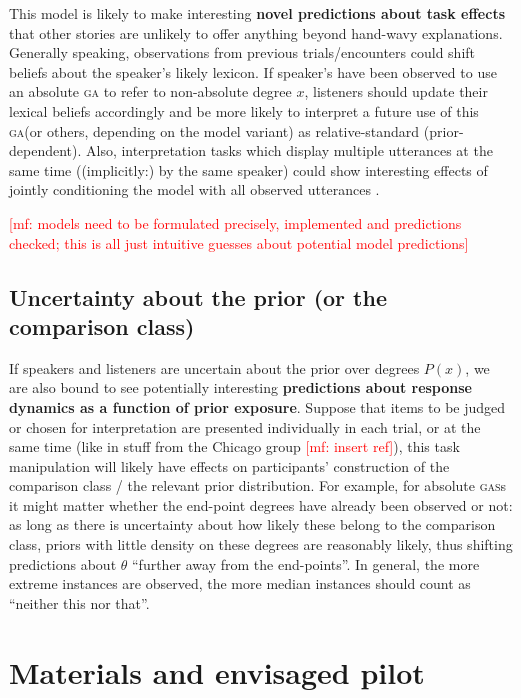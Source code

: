 \documentclass[fleqn,reqno,10pt]{article}
\newcommand{\acro}[1]{{\relsize{+1}\textsc{#1}}\xspace}
\newcommand{\acros}[1]{{\relsize{+1}\textsc{#1}}{\relsize{-1}s}\xspace}
\newcommand{\ga}{\acro{ga}}    %
\newcommand{\gas}{\acros{gas}} %
\newcommand{\mf}[1]{\textcolor{Red}{[mf: #1]}}
\begin{document}
This model is likely to make interesting \textbf{novel predictions about task effects} that
other stories are unlikely to offer anything beyond hand-wavy explanations. Generally speaking,
observations from previous trials/encounters could shift beliefs about the speaker's likely
lexicon. If speaker's have been observed to use an absolute \ga to refer to non-absolute degree
$x$, listeners should update their lexical beliefs accordingly and be more likely to interpret
a future use of this \ga (or others, depending on the model variant) as relative-standard
(prior-dependent). Also, interpretation tasks which display multiple utterances at the same
time ((implicitly:) by the same speaker) could show interesting effects of jointly conditioning
the model with all observed utterances \citep[as observed
by][]{TesslerFranke2018:Not-unreasonabl}.

\mf{models need to be formulated precisely, implemented and predictions checked; this is all
  just intuitive guesses about potential model predictions}

\subsection{Uncertainty about the prior (or the comparison class)}

If speakers and listeners are uncertain about the prior over degrees $P(x)$, we are also bound
to see potentially interesting \textbf{predictions about response dynamics as a function of
  prior exposure}. Suppose that items to be judged or chosen for interpretation are presented
individually in each trial, or at the same time (like in stuff from the Chicago group
\mf{insert ref}), this task manipulation will likely have effects on participants' construction
of the comparison class / the relevant prior distribution. For example, for absolute \gas it
might matter whether the end-point degrees have already been observed or not: as long as there
is uncertainty about how likely these belong to the comparison class, priors with little
density on these degrees are reasonably likely, thus shifting predictions about $\theta$
``further away from the end-points''. In general, the more extreme instances are observed, the
more median instances should count as ``neither this nor that''. 

\section{Materials and envisaged pilot}
\end{document}
